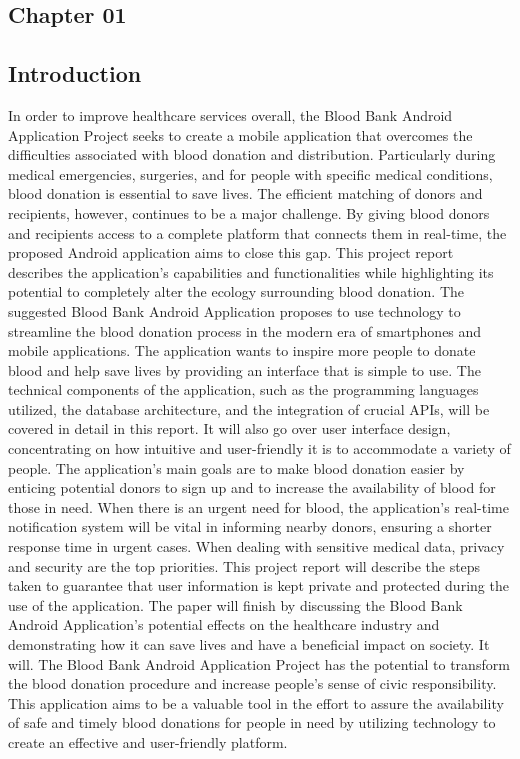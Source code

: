 \begin{center}
\chapter{Chapter 01}
\end{center}
\section{Introduction}
\vspace{5.5mm}
In order to improve healthcare services overall, the Blood Bank Android Application Project seeks to create
a mobile application that overcomes the difficulties associated with blood donation and distribution.
Particularly during medical emergencies, surgeries, and for people with specific medical conditions, blood
donation is essential to save lives. The efficient matching of donors and recipients, however, continues to
be a major challenge. By giving blood donors and recipients access to a complete platform that connects
them in real-time, the proposed Android application aims to close this gap. This project report describes
the application's capabilities and functionalities while highlighting its potential to completely alter the 
ecology surrounding blood donation. The suggested Blood Bank Android Application proposes to use
technology to streamline the blood donation process in the modern era of smartphones and mobile
applications. The application wants to inspire more people to donate blood and help save lives by
providing an interface that is simple to use. The technical components of the application, such as the
programming languages utilized, the database architecture, and the integration of crucial APIs, will be
covered in detail in this report. It will also go over user interface design, concentrating on how intuitive
and user-friendly it is to accommodate a variety of people. The application's main goals are to make blood
donation easier by enticing potential donors to sign up and to increase the availability of blood for those
in need. When there is an urgent need for blood, the application's real-time notification system will be
vital in informing nearby donors, ensuring a shorter response time in urgent cases. When dealing with
sensitive medical data, privacy and security are the top priorities. This project report will describe the
steps taken to guarantee that user information is kept private and protected during the use of the
application. The paper will finish by discussing the Blood Bank Android Application's potential effects on
the healthcare industry and demonstrating how it can save lives and have a beneficial impact on society.
It will. The Blood Bank Android Application Project has the potential to transform the blood donation
procedure and increase people's sense of civic responsibility. This application aims to be a valuable tool
in the effort to assure the availability of safe and timely blood donations for people in need by utilizing
technology to create an effective and user-friendly platform.

